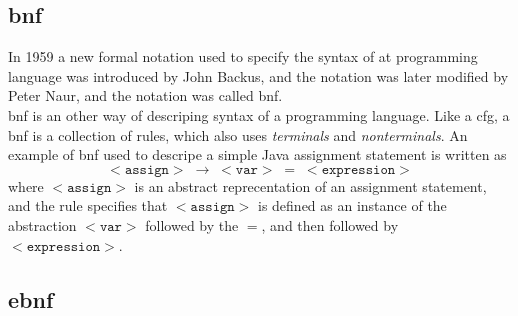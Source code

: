 \subsection*{\ac{bnf}}
In 1959 a new formal notation used to specify the syntax of at programming language was introduced by John Backus, and the notation was later modified by Peter Naur, and the notation was called \ac{bnf}. \\
\ac{bnf} is an other way of descriping syntax of a programming language. Like a \ac{cfg}, a \ac{bnf} is a collection of rules, which also uses \textit{terminals} and \textit{nonterminals}. An example of \ac{bnf} used to descripe a simple Java assignment statement is written as
\[ <\texttt{assign}> \; \rightarrow \; <\texttt{var}> \; = \; <\texttt{expression}> \]
where $<\texttt{assign}>$ is an abstract reprecentation of an assignment statement, and the rule specifies that $<\texttt{assign}>$ is defined as an instance of the abstraction $<\texttt{var}>$ followed by the $=$, and then followed by $<\texttt{expression}>$.

\subsection*{\ac{ebnf}}